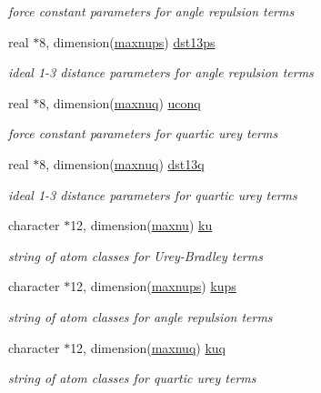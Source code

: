 \begin{DoxyCompactItemize}
\begin{DoxyCompactList}\small\item\em force constant parameters for angle repulsion terms \end{DoxyCompactList}\item 
real $\ast$8, dimension(\hyperlink{classkurybr_a0985b078f790810fc48fafe9ae7732df}{maxnups}) \hyperlink{classkurybr_a9ac144f5e89f0ff12d278007608b9d0f}{dst13ps}
\begin{DoxyCompactList}\small\item\em ideal 1-\/3 distance parameters for angle repulsion terms \end{DoxyCompactList}\item 
real $\ast$8, dimension(\hyperlink{classkurybr_a3e8676e31b4829ad722f50e1130d3744}{maxnuq}) \hyperlink{classkurybr_a24fb0fa1a77c3ee4a9f23aab35600e6b}{uconq}
\begin{DoxyCompactList}\small\item\em force constant parameters for quartic urey terms \end{DoxyCompactList}\item 
real $\ast$8, dimension(\hyperlink{classkurybr_a3e8676e31b4829ad722f50e1130d3744}{maxnuq}) \hyperlink{classkurybr_a87b9e3e0c32664e7aa531fef6e7cd9bc}{dst13q}
\begin{DoxyCompactList}\small\item\em ideal 1-\/3 distance parameters for quartic urey terms \end{DoxyCompactList}\item 
character $\ast$12, dimension(\hyperlink{classkurybr_aaf30bd9a13addd363c837108f12933ca}{maxnu}) \hyperlink{classkurybr_aaa5a733bacfbc38d5ca68d0064489972}{ku}
\begin{DoxyCompactList}\small\item\em string of atom classes for Urey-\/\-Bradley terms \end{DoxyCompactList}\item 
character $\ast$12, dimension(\hyperlink{classkurybr_a0985b078f790810fc48fafe9ae7732df}{maxnups}) \hyperlink{classkurybr_a457e33eaa69a2a95cfeeb92376337664}{kups}
\begin{DoxyCompactList}\small\item\em string of atom classes for angle repulsion terms \end{DoxyCompactList}\item 
character $\ast$12, dimension(\hyperlink{classkurybr_a3e8676e31b4829ad722f50e1130d3744}{maxnuq}) \hyperlink{classkurybr_ac999bd33462bae0efb881aa11f53abee}{kuq}
\begin{DoxyCompactList}\small\item\em string of atom classes for quartic urey terms \end{DoxyCompactList}\end{DoxyCompactItemize}


